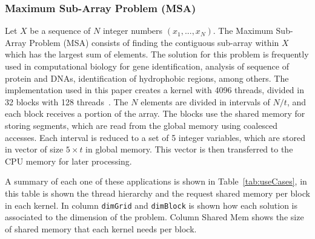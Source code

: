 \subsubsection{Maximum Sub-Array Problem (MSA)}
Let $X$ be a sequence of $N$ integer numbers $(x_1, ... , x_N)$. The Maximum Sub-Array Problem (MSA) consists of finding the contiguous sub-array within $X$ which has the largest sum of elements. The solution for this problem is frequently used in computational biology for gene identification, analysis of sequence of protein and DNAs, identification of hydrophobic regions, among others. The implementation used in this paper creates a kernel with 4096 threads, divided in 32 blocks with 128 threads~\citep{Cleber:Thesis}. The $N$ elements are divided in intervals of $N/t$, and each block receives a portion of the array. The blocks use the shared memory for storing segments, which are read from the global memory using coalesced accesses. Each interval is reduced to a set of 5 integer variables, which are stored in vector of size $5 \times t$ in global memory. This vector is then transferred to the CPU memory for later processing. 

A summary of each one of these applications is shown in Table~\ref{tab:useCases}, in this table is shown the thread hierarchy and the request shared memory per block in each kernel. In column \texttt{dimGrid} and \texttt{dimBlock} is shown how each solution is associated to the dimension of the problem. Column Shared Mem shows the size of shared memory that each kernel needs per block.

\begin{table}[htpb]
    \centering 
    \caption{Key linear algebra applications used in the experiments}
    \label{tab:useCases} 
\end{table}

